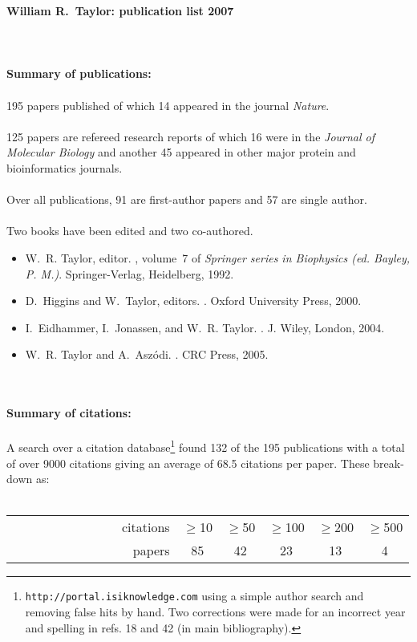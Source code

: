 
{\bf \LARGE
William R.~Taylor: publication list 2007\\ \\ \\ \\
}
{\bf \large
Summary of publications:\\ \\
}
195 papers published of which 14 appeared in the journal {\em Nature}.\\ \\
125 papers are refereed research reports of which 16 were in the
{\em Journal of Molecular Biology} and
another 45 appeared in other major protein and bioinformatics journals.\\ \\
Over all publications, 91 are first-author papers and 57 are single author.\\ \\
Two books have been edited and two co-authored.
\begin{itemize}
\item
W.~R. Taylor, editor.
, volume~7 of {\em
  Springer series in Biophysics (ed. Bayley, P. M.)}.
\newblock Springer-Verlag, Heidelberg, 1992.
\item
D.~Higgins and W.~Taylor, editors.
.
\newblock Oxford University Press, 2000.
\item
I.~Eidhammer, I.~Jonassen, and W.~R. Taylor.
.
\newblock J. Wiley, London, 2004.
\item
W.~R. Taylor and A.~Asz\'odi.
.
\newblock CRC Press, 2005.
\end{itemize}
\ \\ \\
{\bf \large
Summary of citations:\\ \\
}
A search over a citation database\footnote{
{\tt http://portal.isiknowledge.com} using a simple author search and removing
false hits by hand.  Two corrections were made for an incorrect year and spelling
in refs. 18 and 42 (in main bibliography).
}
found 132 of the 195 publications with a total of over 9000 citations giving an
average of 68.5 citations per paper.   These break-down as:\\ \\
\begin{tabular}{r|ccccc}
\ \ \ \ \ \ \ \ \ \ \ \ \ \ \ \ \ citations & $\ge$10 & $\ge$50 & $\ge$100 & $\ge$200 & $\ge$500 \\
\ \ \ \ \ \ \ \ \ \ \ \ \ \ \ \ \ papers    &      85 &      42 &       23 &       13 &        4 \\
\end{tabular}
\clearpage


